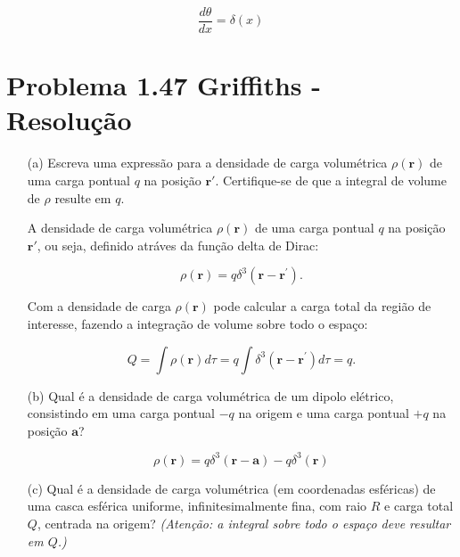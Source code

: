 \documentclass[a4paper,12pt]{article}
\begin{document}
\begin{equation}
    \boxed{
    \frac{d \theta}{d x}=\delta(x)
    }
\end{equation}

\section*{Problema 1.47 Griffiths - Resolu\c{c}\~ao}

\begin{enumerate}
    \item[(a)] Escreva uma expressão para a densidade de carga volumétrica $\rho(\mathbf{r})$ de uma 
    carga pontual $q$ na posição $\mathbf{r}'$. Certifique-se de que a integral de volume de $\rho$ 
    resulte em $q$.

    A densidade de carga volumétrica $\rho(\mathbf{r})$ de uma 
    carga pontual $q$ na posição $\mathbf{r}'$, ou seja, definido
    atr\'aves da função delta de Dirac:

    \begin{equation}
        \boxed{\rho(\mathbf{r})=q \delta^{3}\left(\mathbf{r}-\mathbf{r}^{\prime}\right).}
    \end{equation}

    Com a densidade de carga $\rho(\mathbf{r})$ pode calcular a carga total da regi\~ao de interesse,
    fazendo a integra\c{c}\~ao de volume sobre todo o espa\c{c}o:

    \begin{equation}
        \boxed{Q=\int \rho(\mathbf{r}) d \tau=q \int \delta^{3}\left(\mathbf{r}-\mathbf{r}^{\prime}\right) d \tau=q.}
    \end{equation}


    \item[(b)] Qual é a densidade de carga volumétrica de um dipolo elétrico, consistindo em uma 
    carga pontual $-q$ na origem e uma carga pontual $+q$ na posição $\mathbf{a}$?

    \begin{equation}
        \rho(\mathbf{r})=q \delta^{3}(\mathbf{r}-\mathbf{a})-q \delta^{3}(\mathbf{r})
    \end{equation}

    \item[(c)] Qual é a densidade de carga volumétrica (em coordenadas esféricas) de uma casca 
    esférica uniforme, infinitesimalmente fina, com raio $R$ e carga total $Q$, centrada na origem? 
    \textit{(Atenção: a integral sobre todo o espaço deve resultar em $Q$.)}


\end{enumerate}
\end{document}

